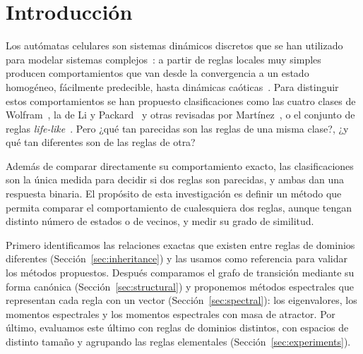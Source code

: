 \section{Introducción}

Los autómatas celulares son sistemas dinámicos discretos que se han utilizado para modelar sistemas complejos~\cite{Torres2025_complejo,sole1996_cs_caos,Hoekstra2010_cs_ca}: a partir de reglas locales muy simples producen comportamientos que van desde la convergencia a un estado homogéneo, fácilmente predecible, hasta dinámicas caóticas~\cite{wolfram1982_ca,Wolfram2002_nks}. Para distinguir estos comportamientos se han propuesto clasificaciones como las cuatro clases de Wolfram~\cite{Wolfram2002_nks}, la de Li y Packard~\cite{li1990_structure} y otras revisadas por Martínez~\cite{genaro2013_class}, o el conjunto de reglas \emph{life-like}~\cite{lifewiki_life}. Pero ¿qué tan parecidas son las reglas de una misma clase?, ¿y qué tan diferentes son de las reglas de otra?

Además de comparar directamente su comportamiento exacto, las clasificaciones son la única medida para decidir si dos reglas son parecidas, y ambas dan una respuesta binaria. El propósito de esta investigación es definir un método que permita comparar el comportamiento de cualesquiera dos reglas, aunque tengan distinto número de estados o de vecinos, y medir su grado de similitud.

Primero identificamos las relaciones exactas que existen entre reglas de dominios diferentes (Sección~\ref{sec:inheritance}) y las usamos como referencia para validar los métodos propuestos. Después comparamos el grafo de transición mediante su forma canónica (Sección~\ref{sec:structural}) y proponemos métodos espectrales que representan cada regla con un vector (Sección~\ref{sec:spectral}): los eigenvalores, los momentos espectrales y los momentos espectrales con masa de atractor. Por último, evaluamos este último con reglas de dominios distintos, con espacios de distinto tamaño y agrupando las reglas elementales (Sección~\ref{sec:experiments}).
